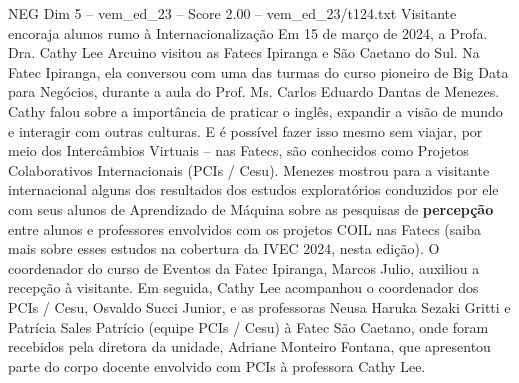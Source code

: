 \begin{textsample}{NEG Dim 5 – vem\_ed\_23 – Score 2.00 – vem\_ed\_23/t124.txt}  \label{ex:f5_neg_105}
Visitante encoraja alunos rumo à Internacionalização Em 15 de março de 2024, a Profa.
Dra.
Cathy Lee Arcuino visitou as Fatecs Ipiranga e São Caetano do Sul.
Na Fatec Ipiranga, ela conversou com uma das turmas do curso pioneiro de Big Data para Negócios, durante a aula do Prof.
Ms.
Carlos Eduardo Dantas de Menezes.
Cathy falou sobre a importância de praticar o inglês, expandir a visão de mundo e interagir com outras culturas.
E é possível fazer isso mesmo sem viajar, por meio dos Intercâmbios Virtuais – nas Fatecs, são conhecidos como Projetos Colaborativos Internacionais (PCIs / Cesu).
Menezes mostrou para a visitante internacional alguns dos resultados dos estudos exploratórios conduzidos por ele com seus alunos de Aprendizado de Máquina sobre as pesquisas de \textbf{percepção} entre alunos e professores envolvidos com os projetos COIL nas Fatecs (saiba mais sobre esses estudos na cobertura da IVEC 2024, nesta edição).
O coordenador do curso de Eventos da Fatec Ipiranga, Marcos Julio, auxiliou a recepção à visitante.
Em seguida, Cathy Lee acompanhou o coordenador dos PCIs / Cesu, Osvaldo Succi Junior, e as professoras Neusa Haruka Sezaki Gritti e Patrícia Sales Patrício (equipe PCIs / Cesu) à Fatec São Caetano, onde foram recebidos pela diretora da unidade, Adriane Monteiro Fontana, que apresentou parte do corpo docente envolvido com PCIs à professora Cathy Lee.

\end{textsample}
